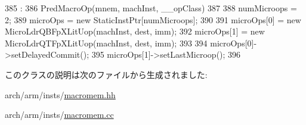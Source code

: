 \begin{DoxyCode}
385                                           :
386     PredMacroOp(mnem, machInst, __opClass)
387 {
388     numMicroops = 2;
389     microOps = new StaticInstPtr[numMicroops];
390 
391     microOps[0] = new MicroLdrQBFpXLitUop(machInst, dest, imm);
392     microOps[1] = new MicroLdrQTFpXLitUop(machInst, dest, imm);
393 
394     microOps[0]->setDelayedCommit();
395     microOps[1]->setLastMicroop();
396 }

\end{DoxyCode}


このクラスの説明は次のファイルから生成されました:\begin{DoxyCompactItemize}
\item 
arch/arm/insts/\hyperlink{macromem_8hh}{macromem.hh}\item 
arch/arm/insts/\hyperlink{macromem_8cc}{macromem.cc}\end{DoxyCompactItemize}
